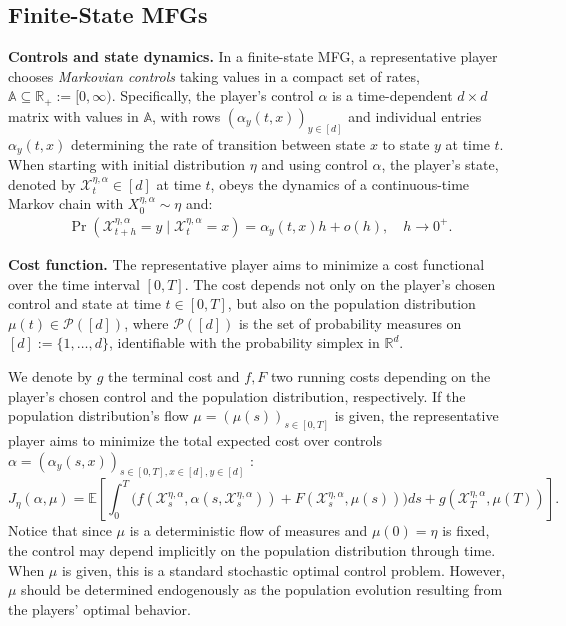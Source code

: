 \documentclass[11pt,reqno]{amsart}
\numberwithin{equation}{section}
\theoremstyle{plain}
\newcommand{\R}{\mathbb{R}}
\newcommand{\calP}{{\mathcal P}}
\newcommand{\calX}{{\mathcal X}}
\newcommand{\A}{\mathbb{A}}
\newcommand{\1}{\boldsymbol{\mathbbm{1}}}
\begin{document}
\subsection{Finite-State MFGs}
\label{sec:mfg-background}
\noindent\textbf{Controls and state dynamics.} In a finite-state MFG, a representative player chooses \textit{Markovian controls} taking values in a compact set of rates, $\A \subseteq \R_+ := [0, \infty)$. Specifically, the player's control $\alpha$ is a time-dependent $d \times d$ matrix with values in $\A$, with rows $(\alpha_y(t, x))_{y\in[d]}$ and individual entries $\alpha_y(t, x)$ determining the rate of transition between state $x$ to state $y$ at time $t$. 
When starting with initial distribution $\eta$ and using control $\alpha$, the player's state, denoted by $\calX^{\eta,\alpha}_t \in [d]$ at time $t$, obeys the dynamics of a continuous-time Markov chain with $X^{\eta,\alpha}_0 \sim \eta$ and:
\begin{align}
\label{eqn:markov-dynamics}
    \Pr(\calX^{\eta,\alpha}_{t + h} = y \mid \calX^{\eta,\alpha}_t = x) = \alpha_{y}(t, x)h + o(h), \quad h \to 0^+.
\end{align}

\noindent\textbf{Cost function.} The representative player aims to minimize a cost functional over the time interval $[0, T]$. The cost depends not only on the player's chosen control and state at time $t \in [0, T]$, but also on the population distribution $\mu(t) \in \calP([d])$, where $\calP([d])$ is the set of probability measures on $[d] := \{1, \ldots, d\}$, identifiable with the probability simplex in $\R^d$. 

We denote by $g$ the terminal cost and $f,F$ two running costs depending on the player's chosen control and the population distribution, respectively.
If the population distribution's flow $\mu = (\mu(s))_{s \in [0,T]}$ is given, the representative player aims to minimize the total expected cost over controls $\alpha = (\alpha_y(s,x))_{s \in [0,T], x \in [d], y\in[d]}$ :
\begin{equation}
\label{eqn:def-J-integral}
        J_\eta(\alpha, \mu) = \mathbb{E} \left[  \int_{0}^T \Big( f(\mathcal{X}^{\eta,\alpha}_s, \alpha(s, \mathcal{X}^{\eta,\alpha}_s)) + F(\mathcal{X}^{\eta,\alpha}_s, \mu(s)) \Big) ds  + g(\mathcal{X}^{\eta,\alpha}_T, \mu(T))\right].
\end{equation}
Notice that since $\mu$ is a deterministic flow of measures and $\mu(0)=\eta$ is fixed, the control may depend implicitly on the population distribution through time. 
When $\mu$ is given, this is a standard stochastic optimal control problem. However, $\mu$ should be determined endogenously as the population evolution resulting from the players' optimal behavior.
\end{document}
